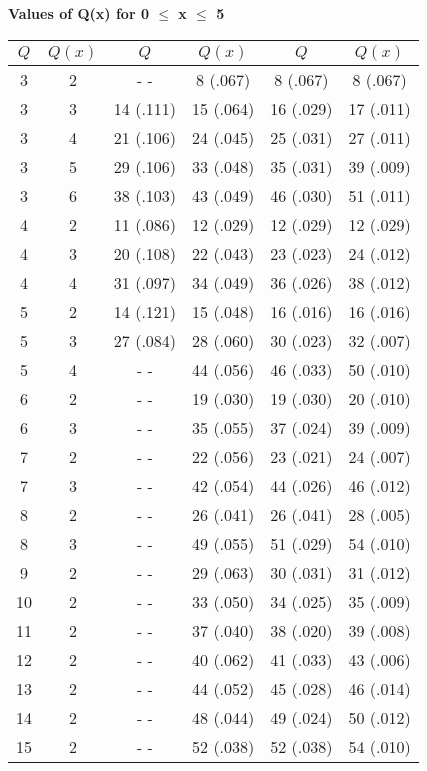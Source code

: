 \documentclass{article}
\begin{document}
\thispagestyle{empty}

\begin{center}
  {\small\textbf{Values of Q(x) for 0 $\le$ x $\le$ 5}}
\end{center}

\begin{center}
\begin{tabular}{|cc||cc||cc|} 

	\hline

	$Q$ & $Q(x)$  & $Q$ & $Q(x)$  & $Q$ & $Q(x)$  \\ \hline
	 3 & 2 & - -       &  8 (.067) &  8 (.067) &  8 (.067) \\
	 3 & 3 & 14 (.111) & 15 (.064) & 16 (.029) & 17 (.011) \\
	 3 & 4 & 21 (.106) & 24 (.045) & 25 (.031) & 27 (.011) \\
	 3 & 5 & 29 (.106) & 33 (.048) & 35 (.031) & 39 (.009) \\
	 3 & 6 & 38 (.103) & 43 (.049) & 46 (.030) & 51 (.011) \\
	 4 & 2 & 11 (.086) & 12 (.029) & 12 (.029) & 12 (.029) \\
	 4 & 3 & 20 (.108) & 22 (.043) & 23 (.023) & 24 (.012) \\
	 4 & 4 & 31 (.097) & 34 (.049) & 36 (.026) & 38 (.012) \\
	 5 & 2 & 14 (.121) & 15 (.048) & 16 (.016) & 16 (.016) \\
	 5 & 3 & 27 (.084) & 28 (.060) & 30 (.023) & 32 (.007) \\
	 5 & 4 & - -       & 44 (.056) & 46 (.033) & 50 (.010) \\
	 6 & 2 & - -       & 19 (.030) & 19 (.030) & 20 (.010) \\
	 6 & 3 & - -       & 35 (.055) & 37 (.024) & 39 (.009) \\
	 7 & 2 & - -       & 22 (.056) & 23 (.021) & 24 (.007) \\
	 7 & 3 & - -       & 42 (.054) & 44 (.026) & 46 (.012) \\
	 8 & 2 & - -       & 26 (.041) & 26 (.041) & 28 (.005) \\
	 8 & 3 & - -       & 49 (.055) & 51 (.029) & 54 (.010) \\
	 9 & 2 & - -       & 29 (.063) & 30 (.031) & 31 (.012) \\
	10 & 2 & - -       & 33 (.050) & 34 (.025) & 35 (.009) \\
	11 & 2 & - -       & 37 (.040) & 38 (.020) & 39 (.008) \\
	12 & 2 & - -       & 40 (.062) & 41 (.033) & 43 (.006) \\
	13 & 2 & - -       & 44 (.052) & 45 (.028) & 46 (.014) \\
	14 & 2 & - -       & 48 (.044) & 49 (.024) & 50 (.012) \\
	15 & 2 & - -       & 52 (.038) & 52 (.038) & 54 (.010) \\ \hline

\end{tabular}
\end{center}
\end{document}
